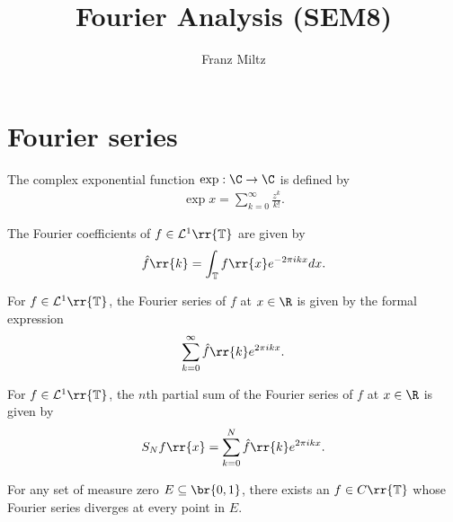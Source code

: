 \documentclass{article}
\begin{document}
\mkthmstwounified
\title{Fourier Analysis (SEM8)}
\author{Franz Miltz}
\maketitle
\tableofcontents
\pagebreak

\section{Fourier series}

\begin{definition}
  The complex exponential function $\exp : \C\to\C$ is defined by
  \begin{align*}
    \exp x = \sum_{k=0}^{ \infty } \frac{z^k}{k!}.
  \end{align*}
\end{definition}

\begin{definition}
  The Fourier coefficients of $f\in\mathcal L^1\rr{\mathbb T}$ are given by
  \begin{align}\label{eq:fourier_coefficients}
    \hat f\rr{k} = \int_{\mathbb T} f\rr{x} e^{-2\pi i k x} dx.
  \end{align}
\end{definition}

\begin{definition}
  For $f\in\mathcal L^1\rr{\mathbb T}$, the Fourier series of $f$ at $x\in\R$ is
  given by the formal expression
  \begin{align*}
    \sum_{k=0}^\infty \hat f\rr{k} e^{2\pi i k x}.
  \end{align*}
\end{definition}

\begin{definition}
  For $f\in\mathcal L^1\rr{\mathbb T}$, the $n$th partial sum of the Fourier series
  of $f$ at $x\in\R$ is given by
  \begin{align*}
    S_N f\rr{x} = \sum_{k=0}^N \hat f\rr{k}e^{2\pi i k x}.
  \end{align*}
\end{definition}

\begin{theorem}[Katznelson]
  For any set of measure zero $E\subseteq\br{0,1}$, there exists an $f\in C\rr{\mathbb T}$
  whose Fourier series diverges at every point in $E$.
\end{theorem}
\end{document}
